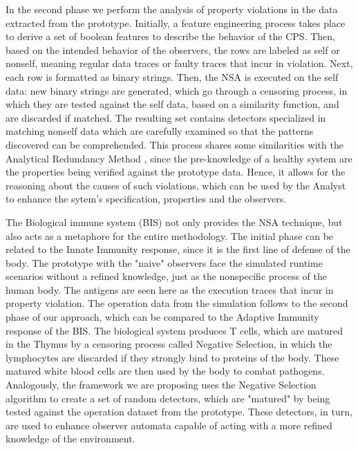 
In the second phase we perform the analysis of property violations in the data extracted from the prototype. Initially, a feature engineering process takes place to derive a set of boolean features to describe the behavior of the CPS. Then, based on the intended behavior of the observers, the rows are labeled as self or nonself, meaning regular data traces or faulty traces that incur in violation. Next, each row is formatted as binary strings. Then, the NSA is executed on the self data: new binary strings are generated, which go through a censoring process, in which they are tested against the self data, based on a similarity function, and are discarded if matched. The resulting set contains detectors specialized in matching nonself data which are carefully examined so that the patterns discovered can be comprehended. This process shares some similarities with the Analytical Redundancy Method \cite{gao2015survey}, since the pre-knowledge of a healthy system are the properties being verified against the prototype data. Hence, it allows for the reasoning about the causes of such violations, which can be used by the Analyst to enhance the sytem's specification, properties and the observers.

The Biological immune system (BIS) not only provides the NSA technique, but also acts as a metaphore for the entire methodology. The initial phase can be related to the Innate Immunity response, since it is the first line of defense of the body. The prototype with the "naive" observers face the simulated runtime scenarios without a refined knowledge, just as the nonspecific process of the human body. The antigens are seen here as the execution traces that incur in property violation. The operation data from the simulation follows to the second phase of our approach, which can be compared to the Adaptive Immunity response of the BIS. The biological system produces T cells, which are matured in the Thymus by a censoring process called Negative Selection, in which the lymphocytes are discarded if they strongly bind to proteins of the body. These matured white blood cells are then used by the body to combat pathogens. Analogously, the framework we are proposing uses the Negative Selection algorithm to create a set of random detectors, which are "matured" by being tested against the operation dataset from the prototype. These detectors, in turn, are used to enhance observer automata capable of acting with a more refined knowledge of the environment. 


